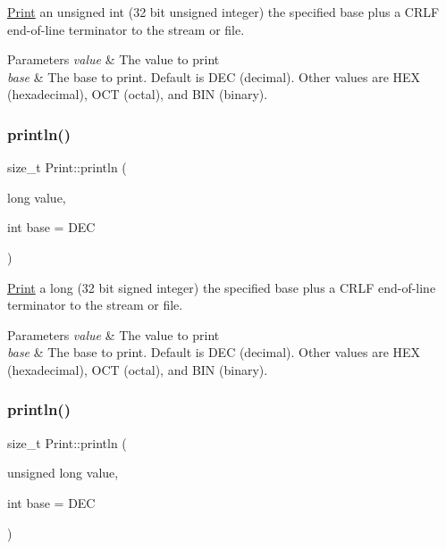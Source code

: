\mbox{\hyperlink{class_print}{Print}} an unsigned int (32 bit unsigned integer) the specified base plus a C\+R\+LF end-\/of-\/line terminator to the stream or file. 


\begin{DoxyParams}{Parameters}
{\em value} & The value to print \\
\hline
{\em base} & The base to print. Default is D\+EC (decimal). Other values are H\+EX (hexadecimal), O\+CT (octal), and B\+IN (binary). \\
\hline
\end{DoxyParams}
\mbox{\label{class_print_a82bbe59b28440c29e55ff3597eb45376}} 
\subsubsection{\texorpdfstring{println()}{println()}\hspace{0.1cm}{\footnotesize\ttfamily [4/6]}}
{\footnotesize\ttfamily size\+\_\+t Print\+::println (\begin{DoxyParamCaption}\item[{long}]{value,  }\item[{int}]{base = {\ttfamily DEC} }\end{DoxyParamCaption})}



\mbox{\hyperlink{class_print}{Print}} a long (32 bit signed integer) the specified base plus a C\+R\+LF end-\/of-\/line terminator to the stream or file. 


\begin{DoxyParams}{Parameters}
{\em value} & The value to print \\
\hline
{\em base} & The base to print. Default is D\+EC (decimal). Other values are H\+EX (hexadecimal), O\+CT (octal), and B\+IN (binary). \\
\hline
\end{DoxyParams}
\mbox{\label{class_print_afa936d7e8dd329d9162f2cd28f42681e}} 
\subsubsection{\texorpdfstring{println()}{println()}\hspace{0.1cm}{\footnotesize\ttfamily [5/6]}}
{\footnotesize\ttfamily size\+\_\+t Print\+::println (\begin{DoxyParamCaption}\item[{unsigned long}]{value,  }\item[{int}]{base = {\ttfamily DEC} }\end{DoxyParamCaption})}



